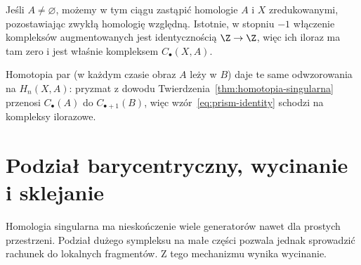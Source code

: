 Jeśli $A\ne\varnothing$, możemy w tym ciągu zastąpić homologie
$A$ i $X$ zredukowanymi, pozostawiając zwykłą homologię względną.
Istotnie, w stopniu $-1$ włączenie kompleksów augmentowanych
jest identycznością $\Z\to\Z$, więc ich iloraz ma tam zero
i jest właśnie kompleksem $C_\bullet(X,A)$.

Homotopia par (w każdym czasie obraz $A$
leży w $B$) daje te same odwzorowania na $H_n(X,A)$:
pryzmat z dowodu Twierdzenia~\ref{thm:homotopia-singularna}
przenosi $C_\bullet(A)$ do $C_{\bullet+1}(B)$,
więc wzór~\eqref{eq:prism-identity}
schodzi na kompleksy ilorazowe.

\section{Podział barycentryczny, wycinanie i sklejanie}
\label{sec:wycinanie-homologia}

Homologia singularna ma nieskończenie wiele generatorów nawet
dla prostych przestrzeni. Podział dużego sympleksu na małe
części pozwala jednak sprowadzić rachunek do lokalnych
fragmentów. Z tego mechanizmu wynika wycinanie.

